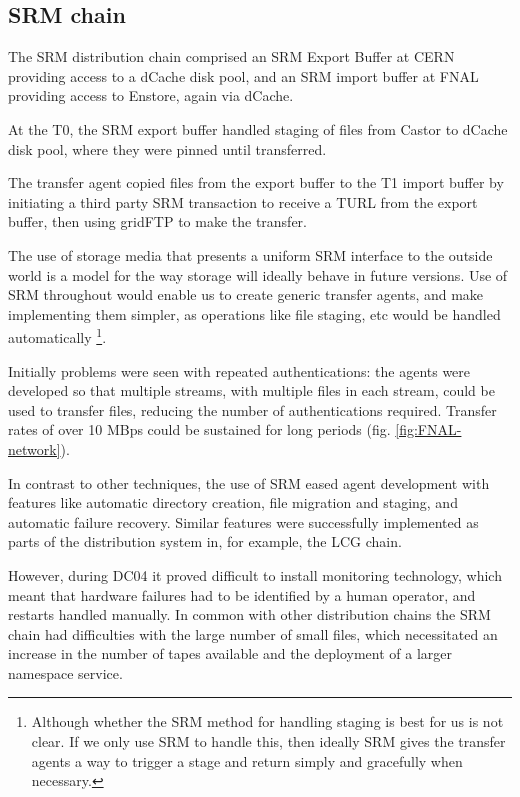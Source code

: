 \documentclass{cmspaper}
\begin{document}
\subsection{SRM chain}
The SRM distribution chain comprised an SRM Export Buffer at CERN
providing access to a dCache disk pool, and an SRM import buffer at
FNAL providing access to Enstore, again via dCache.

At the T0, the SRM export buffer handled staging of files from Castor
to dCache disk pool, where they were pinned until transferred.

The transfer agent copied files from the export buffer to the T1
import buffer by initiating a third party SRM transaction to receive a
TURL from the export buffer, then using gridFTP to make the transfer.

The use of storage media that presents a uniform SRM interface to the
outside world is a model for the way storage will ideally behave in
future versions. Use of SRM throughout would enable us to create
generic transfer agents, and make implementing them simpler, as
operations like file staging, etc would be handled automatically
\footnote{Although whether the SRM method for handling staging is best
for us is not clear. If we only use SRM to handle this, then ideally
SRM gives the transfer agents a way to trigger a stage and return
simply and gracefully when necessary.}.

Initially problems were seen with repeated authentications: the agents
were developed so that multiple streams, with multiple files in each
stream, could be used to transfer files, reducing the number of
authentications required. Transfer rates of over 10 MBps could be
sustained for long periods (fig. \ref{fig:FNAL-network}).

In contrast to other techniques, the use of SRM eased agent
development with features like automatic directory creation, file
migration and staging, and automatic failure recovery. Similar
features were successfully implemented as parts of the distribution
system in, for example, the LCG chain.

However, during DC04 it proved difficult to install monitoring
technology, which meant that hardware failures had to be identified by
a human operator, and restarts handled manually. In common with other
distribution chains the SRM chain had difficulties with the large
number of small files, which necessitated an increase in the number of
tapes available and the deployment of a larger namespace service.
\end{document}
